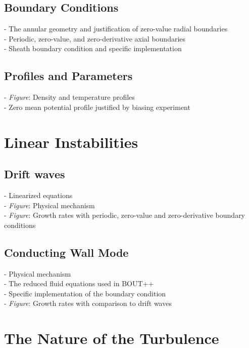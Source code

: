 \documentclass[12pt]{article}
\begin{document}
\subsection{Boundary Conditions}

- The annular geometry and justification of zero-value radial boundaries \\
- Periodic, zero-value, and zero-derivative axial boundaries \\
- Sheath boundary condition and specific implementation \\

\subsection{Profiles and Parameters}

- \emph{Figure}: Density and temperature profiles \\
- Zero mean potential profile justified by biasing experiment \\

\section{Linear Instabilities}

\subsection{Drift waves}

- Linearized equations \\
- \emph{Figure}: Physical mechanism \\
- \emph{Figure}: Growth rates with periodic, zero-value and zero-derivative boundary conditions \\

\subsection{Conducting Wall Mode}

- Physical mechanism \\
- The reduced fluid equations used in BOUT++ \\
- Specific implementation of the boundary condition \\
- \emph{Figure}: Growth rates with comparison to drift waves \\


\section{The Nature of the Turbulence}
\end{document}
